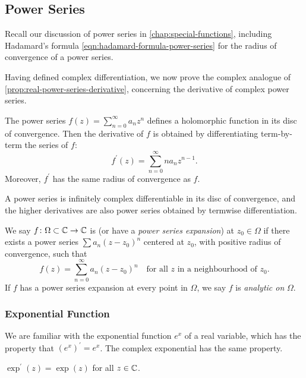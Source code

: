 \subsection{Power Series}
Recall our discussion of power series in \cref{chap:special-functions}, including Hadamard's formula \eqref{eqn:hadamard-formula-power-series} for the radius of convergence of a power series.

Having defined complex differentiation, we now prove the complex analogue of \ref{prop:real-power-series-derivative}, concerning the derivative of complex power series.

\begin{proposition}\label{prop:power-series-derivative}
The power series $f(z)=\sum_{n=0}^{\infty}a_n z^n$ defines a holomorphic function in its disc of convergence. Then the derivative of $f$ is obtained by differentiating term-by-term the series of $f$:
\begin{equation}
f^\prime(z)=\sum_{n=0}^{\infty}na_n z^{n-1}.
\end{equation}
Moreover, $f^\prime$ has the same radius of convergence as $f$.
\end{proposition}

\begin{corollary}
A power series is infinitely complex differentiable in its disc of convergence, and the higher derivatives are also power series obtained by termwise differentiation.
\end{corollary}

\begin{definition}
We say $f\colon\Omega\subset\mathbb C\to\mathbb C$ is  (or have a \emph{power series expansion}) at $z_0\in\Omega$ if there exists a power series $\sum a_n(z-z_0)^n$ centered at $z_0$, with positive radius of convergence, such that
\[f(z)=\sum_{n=0}^{\infty}a_n(z-z_0)^n\quad\text{for all $z$ in a neighbourhood of $z_0$.}\]
If $f$ has a power series expansion at every point in $\Omega$, we say $f$ is \emph{analytic on} $\Omega$.
\end{definition}

\subsubsection{Exponential Function}
We are familiar with the exponential function $e^x$ of a real variable, which has the property that $(e^x)^\prime=e^x$. The complex exponential has the same property.

\begin{lemma}
$\exp^\prime(z)=\exp(z)$ for all $z\in\mathbb C$.
\end{lemma}

